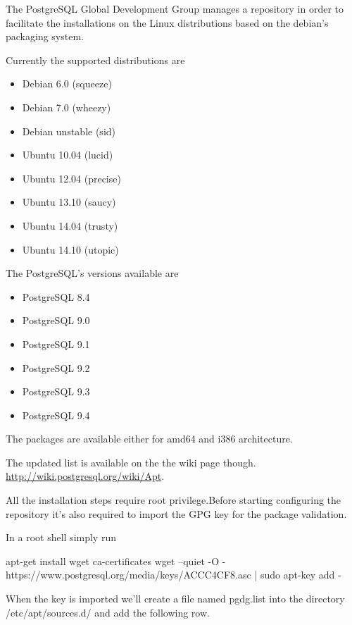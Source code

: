 The PostgreSQL Global Development Group manages a repository in order to facilitate the
installations on the Linux distributions based on the debian's packaging system. 

Currently the supported distributions are

\begin{itemize}
 \item Debian 6.0 (squeeze)
 \item Debian 7.0 (wheezy)
 \item Debian unstable (sid) 
 \item Ubuntu 10.04 (lucid)
 \item Ubuntu 12.04 (precise)
 \item Ubuntu 13.10 (saucy)
 \item Ubuntu 14.04 (trusty) 
 \item Ubuntu 14.10 (utopic) 
\end{itemize}

The PostgreSQL's versions available are 
\begin{itemize}
 \item PostgreSQL 8.4
 \item PostgreSQL 9.0 
 \item PostgreSQL 9.1 
 \item PostgreSQL 9.2 
 \item PostgreSQL 9.3
 \item PostgreSQL 9.4
\end{itemize}

The packages are available either for amd64 and i386 architecture.

The updated list is available on the the wiki page though.\newline
\href{http://wiki.postgresql.org/wiki/Apt}{http://wiki.postgresql.org/wiki/Apt}.\newline

All the installation steps require root privilege.Before starting configuring the repository it's also 
required to import the GPG key for the package validation.

In a root shell simply run
\begin{tinyverbatim}
apt-get install wget ca-certificates
wget --quiet -O - https://www.postgresql.org/media/keys/ACCC4CF8.asc | sudo apt-key add -
\end{tinyverbatim}

When the key is imported we'll create a file named pgdg.list into the directory /etc/apt/sources.d/ and
add the following row.

